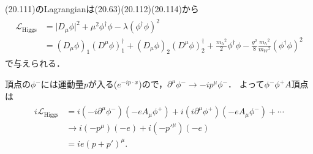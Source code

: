 (20.111)のLagrangianは(20.63)(20.112)(20.114)から
\begin{align}
  \begin{split}
    \mathcal{L}_\text{Higgs} &= \lvert D_\mu\phi\rvert^2 + \mu^2 \phi^\dagger \phi - \lambda (\phi^\dagger\phi)^2 \\
    &= (D_\mu\phi)_1(D^\mu\phi)_1^\dagger + (D_\mu\phi)_2(D^\mu\phi)_2^\dagger
    + \frac{m_h{}^2}{2} \phi^\dagger \phi - \frac{g^2}{8} \frac{m_h{}^2}{m_W{}^2} (\phi^\dagger\phi)^2
  \end{split}
  \label{fig21.8_scalar_Lagrangian}
\end{align}
で与えられる．

\begin{center}
\end{center}

頂点の\(\phi^-\)には運動量\(p\)が入る(\(e^{-ip\cdot x}\))ので，\(\partial^\mu\phi^- \to -ip^\mu\phi^-\)．
よって\(\phi^-\phi^+A\)頂点は
\begin{align}
  \begin{split}
    i\mathcal{L}_\text{Higgs} &= i (-i\partial^\mu\phi^-) (-eA_\mu\phi^+) + i (i\partial^\mu\phi^+) (-eA_\mu\phi^-) + \cdots \\
    &\to i (-p^\mu) (-e) + i (-p'^\mu) (-e) \\
    &= ie(p+p')^\mu .
  \end{split}
  \label{fig21.8_phi_phi_A}
\end{align}

